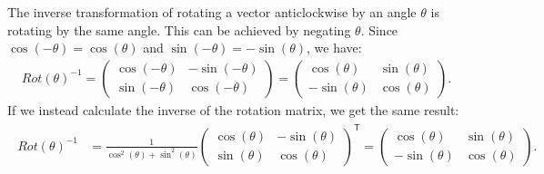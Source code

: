 \documentclass[letterpaper,10pt,english]{jupyterBook}
\begin{document}
\sphinxAtStartPar
The inverse transformation of rotating a vector anti\sphinxhyphen{}clockwise by an angle \(\theta\) is rotating  by the same angle. This can be achieved by negating \(\theta\). Since \(\cos(-\theta) = \cos(\theta)\) and \(\sin(-\theta) = -\sin(\theta)\), we have:
\begin{equation*}
\begin{split} Rot(\theta)^{-1} = \begin{pmatrix}
        \cos(-\theta) & -\sin(-\theta) \\
        \sin(-\theta) & \cos(-\theta)
   \end{pmatrix}
   = \begin{pmatrix}
       \cos(\theta) & \sin(\theta) \\
       -\sin(\theta) & \cos(\theta)
   \end{pmatrix}. \end{split}
\end{equation*}
\sphinxAtStartPar
If we instead calculate the inverse of the rotation matrix, we get the same result:
\begin{equation*}
\begin{split} \begin{align*}
    Rot(\theta)^{-1} &= \frac{1}{\cos^2(\theta) + \sin^2(\theta)}
    \begin{pmatrix}
        \cos(\theta) & -\sin(\theta) \\
        \sin(\theta) & \cos(\theta)
    \end{pmatrix}^\mathsf{T}
    = \begin{pmatrix}
        \cos(\theta) & \sin(\theta) \\
        -\sin(\theta) & \cos(\theta)
    \end{pmatrix}.
\end{align*} \end{split}
\end{equation*}\label{_pages/6.3_Rotation_reflection_and_translation:rotation-example}
\end{document}
